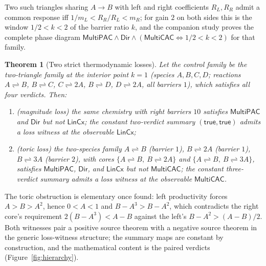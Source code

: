 \documentclass[11pt,a4paper]{article}
\theoremstyle{plain}
\newtheorem{theorem}{Theorem}[section]
\theoremstyle{definition}
\theoremstyle{remark}
\newcommand{\MPAC}{\mathsf{MultiPAC}}
\newcommand{\MCAC}{\mathsf{MultiCAC}}
\newcommand{\DIR}{\mathsf{Dir}}
\newcommand{\LCC}{\mathsf{LinCx}}
\begin{document}
Two such triangles sharing $A\to B$ with left and right coefficients $R_L,R_R$ admit a common response iff $1/m_L<R_R/R_L<m_R$; for gain $2$ on both sides this is the window $1/2<k<2$ of the barrier ratio $k$, and the companion study proves the complete phase diagram $\MPAC\wedge\DIR\wedge(\MCAC\iff 1/2<k<2)$ for that family.

\begin{theorem}[Two strict thermodynamic losses]\label{thm:thermo-loss}
Let the control family be the two-triangle family at the interior point $k=1$ (species $A,B,C,D$; reactions $A\rightleftharpoons B$, $B\rightleftharpoons C$, $C\rightleftharpoons 2A$, $B\rightleftharpoons D$, $D\rightleftharpoons 2A$, all barriers $1$), which satisfies all four verdicts. Then:
\begin{enumerate}[label=(\roman*)]
\item (\emph{magnitude loss}) the same chemistry with right barriers $10$ satisfies $\MPAC$ and $\DIR$ but not $\LCC$; the constant two-verdict summary $(\mathsf{true},\mathsf{true})$ admits a loss witness at the observable $\LCC$;
\item (\emph{toric loss}) the two-species family $A\rightleftharpoons B$ (barrier $1$), $B\rightleftharpoons 2A$ (barrier $1$), $B\rightleftharpoons 3A$ (barrier $2$), with cores $\{A\rightleftharpoons B,\ B\rightleftharpoons 2A\}$ and $\{A\rightleftharpoons B,\ B\rightleftharpoons 3A\}$, satisfies $\MPAC$, $\DIR$, and $\LCC$ but not $\MCAC$; the constant three-verdict summary admits a loss witness at the observable $\MCAC$.
\end{enumerate}
\end{theorem}

The toric obstruction is elementary once found: left productivity forces $A>B>A^2$, hence $0<A<1$ and $B-A^3>B-A^2$, which contradicts the right core's requirement $2(B-A^3)<A-B$ against the left's $B-A^2>(A-B)/2$. Both witnesses pair a positive source theorem with a negative source theorem in the generic loss-witness structure; the summary maps are constant by construction, and the mathematical content is the paired verdicts (Figure~\ref{fig:hierarchy}).
\end{document}
